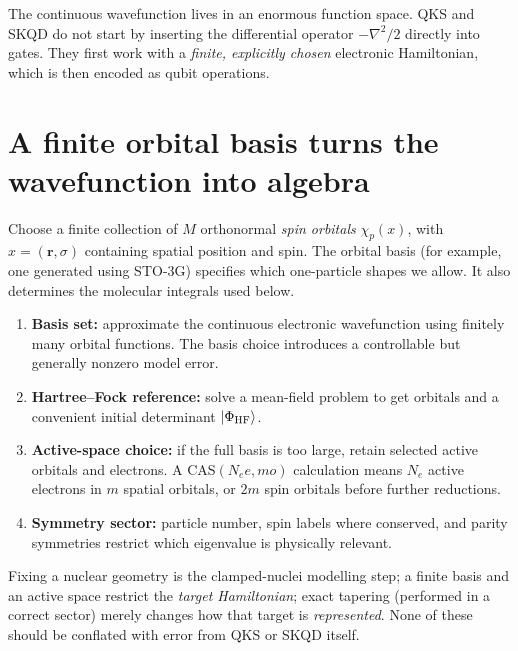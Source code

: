 \documentclass[11pt,a4paper,oneside]{report}
\newcommand{\ket}[1]{\lvert #1\rangle}
\begin{document}
\begin{idea}
The continuous wavefunction lives in an enormous function space. QKS and SKQD do not start by inserting the differential operator $-\nabla^2/2$ directly into gates. They first work with a \emph{finite, explicitly chosen} electronic Hamiltonian, which is then encoded as qubit operations.
\end{idea}

\section{A finite orbital basis turns the wavefunction into algebra}
Choose a finite collection of $M$ orthonormal \emph{spin orbitals} $\chi_p(x)$, with $x=(\mathbf r,\sigma)$ containing spatial position and spin. The orbital basis (for example, one generated using STO-3G) specifies which one-particle shapes we allow. It also determines the molecular integrals used below.

\begin{enumerate}[label=\textbf{\arabic*.}]
\item \textbf{Basis set:} approximate the continuous electronic wavefunction using finitely many orbital functions. The basis choice introduces a controllable but generally nonzero model error.
\item \textbf{Hartree--Fock reference:} solve a mean-field problem to get orbitals and a convenient initial determinant $\ket{\Phi_{\rm HF}}$.
\item \textbf{Active-space choice:} if the full basis is too large, retain selected active orbitals and electrons. A CAS$(N_e e,m o)$ calculation means $N_e$ active electrons in $m$ spatial orbitals, or $2m$ spin orbitals before further reductions.
\item \textbf{Symmetry sector:} particle number, spin labels where conserved, and parity symmetries restrict which eigenvalue is physically relevant.
\end{enumerate}

\begin{caution}
Fixing a nuclear geometry is the clamped-nuclei modelling step; a finite basis and an active space restrict the \emph{target Hamiltonian}; exact tapering (performed in a correct sector) merely changes how that target is \emph{represented}. None of these should be conflated with error from QKS or SKQD itself.
\end{caution}
\end{document}
